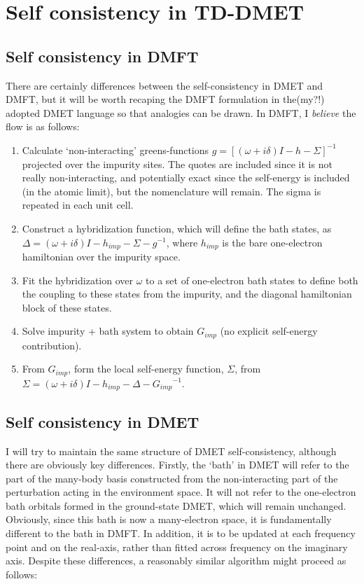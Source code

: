 \documentclass[a4paper,oneside,11pt]{article}
\numberwithin{equation}{section}
\def \Gimp {{G_{imp} }}
\begin{document}

\section*{\Large Self consistency in TD-DMET}

\subsection{Self consistency in DMFT}

There are certainly differences between the self-consistency in DMET and DMFT, but it will be worth recaping the DMFT formulation in the(my?!) adopted DMET language so that analogies can be drawn.
In DMFT, I {\em believe} the flow is as follows:
\begin{enumerate}
\item Calculate `non-interacting' greens-functions $g = [(\omega + i\delta)I - h - \Sigma]^{-1}$ projected over the impurity sites. The quotes are included since it is not really non-interacting, and potentially exact since the self-energy is included (in the atomic limit), but the nomenclature will remain. The sigma is repeated in each unit cell.
\item Construct a hybridization function, which will define the bath states, as $\Delta = (\omega + i\delta)I - h_{imp} - \Sigma - g^{-1}$, where $h_{imp}$ is the bare one-electron hamiltonian over the impurity space.
\item Fit the hybridization over $\omega$ to a set of one-electron bath states to define both the coupling to these states from the impurity, and the diagonal hamiltonian block of these states.
\item Solve impurity + bath system to obtain $\Gimp$ (no explicit self-energy contribution).
\item From $\Gimp$, form the local self-energy function, $\Sigma$, from $\Sigma = (\omega + i\delta)I - h_{imp} - \Delta - \Gimp^{-1}$.
\end{enumerate}

\subsection{Self consistency in DMET}

I will try to maintain the same structure of DMET self-consistency, although there are obviously key differences. Firstly, the `bath' in DMET will refer to the part of the many-body basis
constructed from the non-interacting part of the perturbation acting in the environment space. It will not refer to the one-electron bath orbitals formed in the 
ground-state DMET, which will remain unchanged. Obviously, since this bath is now a many-electron space, it is fundamentally different to the bath in DMFT. In addition, it is to be updated at
each frequency point and on the real-axis, rather than fitted across frequency on the imaginary axis. Despite these differences, a reasonably similar algorithm might proceed as follows:
\end{document}
